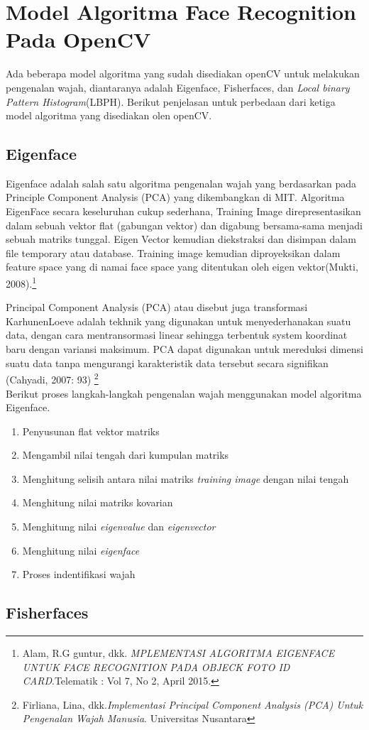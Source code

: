 \newpage
\chapter{Model Algoritma  Face Recognition Pada OpenCV}
Ada beberapa model algoritma yang sudah disediakan openCV untuk melakukan pengenalan wajah, diantaranya adalah
Eigenface, Fisherfaces, dan \emph{Local binary Pattern Histogram}(LBPH). Berikut penjelasan untuk perbedaan dari ketiga model algoritma yang disediakan olen openCV.
\section{Eigenface}

Eigenface adalah salah satu algoritma pengenalan wajah yang berdasarkan pada Principle Component Analysis (PCA) yang dikembangkan di MIT.
Algoritma EigenFace secara keseluruhan cukup sederhana, Training Image direpresentasikan dalam sebuah vektor flat (gabungan vektor) dan digabung
bersama-sama menjadi sebuah matriks tunggal. Eigen Vector kemudian diekstraksi dan disimpan dalam file temporary atau database. Training image
kemudian diproyeksikan dalam feature space yang di namai face space yang ditentukan oleh eigen vektor(Mukti, 2008).\footnote{Alam, R.G guntur, dkk.
\emph{MPLEMENTASI ALGORITMA EIGENFACE UNTUK FACE RECOGNITION PADA OBJECK FOTO ID CARD}.Telematik : Vol 7, No 2, April 2015.}

Principal Component Analysis (PCA) atau disebut juga transformasi KarhunenLoeve adalah tekhnik yang digunakan untuk menyederhanakan suatu data, dengan cara mentransormasi linear sehingga terbentuk
system koordinat baru dengan variansi maksimum. PCA dapat digunakan untuk mereduksi dimensi suatu data tanpa mengurangi karakteristik data tersebut secara signifikan (Cahyadi, 2007: 93)
\footnote{Firliana, Lina, dkk.\emph{Implementasi Principal Component Analysis (PCA) Untuk Pengenalan Wajah Manusia}. Universitas Nusantara}\\

Berikut proses langkah-langkah pengenalan wajah menggunakan model algoritma Eigenface.
\begin{enumerate}[1. ]
    \item Penyusunan flat vektor matriks
    \item Mengambil nilai tengah dari kumpulan matriks
    \item Menghitung selisih antara nilai matriks \emph{training image} dengan nilai tengah
    \item Menghitung nilai matriks kovarian
    \item Menghitung nilai \emph{eigenvalue} dan \emph{eigenvector}
    \item Menghitung nilai \emph{eigenface}
    \item Proses indentifikasi wajah 
\end{enumerate}

\section{Fisherfaces}